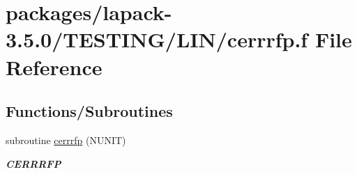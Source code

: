 \hypertarget{cerrrfp_8f}{}\section{packages/lapack-\/3.5.0/\+T\+E\+S\+T\+I\+N\+G/\+L\+I\+N/cerrrfp.f File Reference}
\label{cerrrfp_8f}
\subsection*{Functions/\+Subroutines}
\begin{DoxyCompactItemize}
\item 
subroutine \hyperlink{group__complex__lin_ga2f55ea23ec898f0d14324b6f01de6edf}{cerrrfp} (N\+U\+N\+I\+T)
\begin{DoxyCompactList}\small\item\em {\bfseries C\+E\+R\+R\+R\+F\+P} \end{DoxyCompactList}\end{DoxyCompactItemize}
